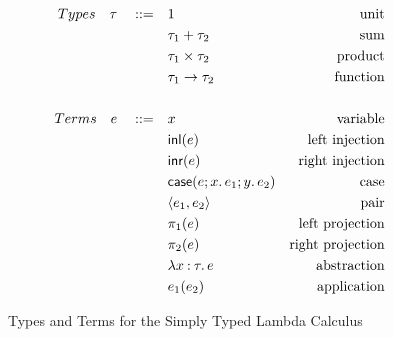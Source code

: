 \begin{figure}[h]
    \begin{align*}
        Types \quad \tau \quad ::= \quad & 1 &\text{unit} \\
        & \tau_1 + \tau_2 &\text{sum} \\
        & \tau_1 \times \tau_2 &\text{product} \\
        & \tau_1 \rightarrow \tau_2 &\text{function} \\
        \\
        Terms \quad e \quad ::= \quad & x &\text{variable} \\
        & \LamInl{e} &\text{left injection} \\
        & \LamInr{e} &\text{right injection} \\
        & \LamCase{e}{x}{e_1}{y}{e_2} &\text{case} \\
        & \Tuple{e_1}{e_2} &\text{pair} \\
        & \Proj{e} &\text{left projection} \\
        & \Proj[2]{e} &\text{right projection} \\
        & \Lam{x}[\tau]{e} &\text{abstraction} \\
        & e_1 (e_2) &\text{application}
    \end{align*}
    \caption{Types and Terms for the Simply Typed Lambda Calculus}
    \label{fig: tt stlc}
\end{figure}

